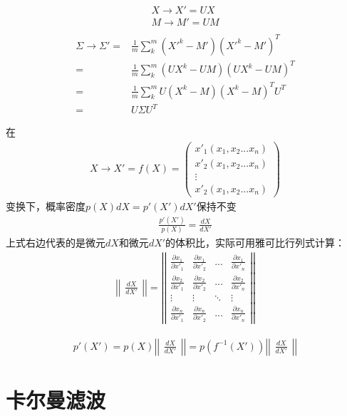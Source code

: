 \begin{gather}
    X\rightarrow X'=UX\\
    M\rightarrow M'=UM\\
\end{gather}
\begin{align}
    \Sigma \rightarrow \Sigma'
    =& \frac{1}{m} \sum_{k}^{m} (X'^{k}-M')(X'^{k}-M')^{T}\\
    =& \frac{1}{m} \sum_{k}^{m} (UX^{k}-UM)(UX^{k}-UM)^{T}\\
    =& \frac{1}{m} \sum_{k}^{m} U(X^{k}-M)(X^{k}-M)^{T}U^{T}\\
    =& U \Sigma U^{T}
\end{align}

在
\begin{gather}
    X\rightarrow X'=f(X) =
    \begin{pmatrix}
        x'_{1}(x_{1},x_{2}...x_{n})\\
        x'_{2}(x_{1},x_{2}...x_{n})\\
        \vdots\\
        x'_{2}(x_{1},x_{2}...x_{n})
    \end{pmatrix}
\end{gather}
变换下，概率密度$p(X)dX = p'(X')dX'$保持不变
\begin{gather}
    \frac{p'(X')}{p(X)}=\frac{dX}{dX'}
\end{gather}
上式右边代表的是微元$dX$和微元$dX'$的体积比，实际可用雅可比行列式计算：
\begin{gather}
    \left | \left |
    \begin{matrix}
        \frac{dX}{dX'}
    \end{matrix}
    \right | \right |
    = \left | \left |
    \begin{matrix}
        \frac{\partial x_{1}}{\partial x'_{1}} & \frac{\partial x_{1}}{\partial x'_{2}} & ... & \frac{\partial x_{1}}{\partial x'_{n}}\\
        \frac{\partial x_{2}}{\partial x'_{1}} & \frac{\partial x_{2}}{\partial x'_{2}} & ... & \frac{\partial x_{2}}{\partial x'_{n}}\\
        \vdots & \vdots & \ddots & \vdots\\
        \frac{\partial x_{n}}{\partial x'_{1}} & \frac{\partial x_{n}}{\partial x'_{2}} & ... & \frac{\partial x_{n}}{\partial x'_{n}}
    \end{matrix}
    \right | \right |
\end{gather}

\begin{gather}
    p'(X') = p(X)
    \left | \left |
    \begin{matrix}
        \frac{dX}{dX'}
    \end{matrix}
    \right | \right |
    = p(f^{-1}(X'))
    \left | \left |
    \begin{matrix}
        \frac{dX}{dX'}
    \end{matrix}
    \right | \right |
\end{gather}

\section{卡尔曼滤波}
